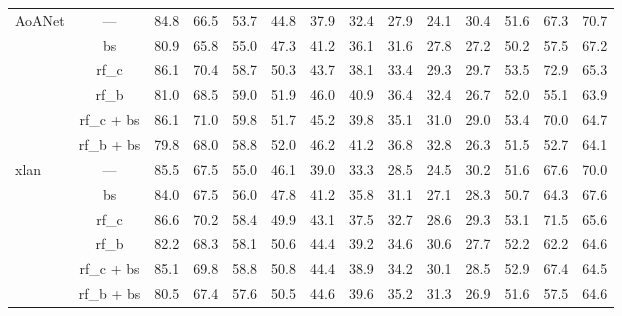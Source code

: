 \documentclass[journal,comsoc]{IEEEtran}
\begin{document}
\begin{table*}[htp]
\begin{tabular}{l|c|cccccccccccc}
\multirow{6}{*}{AoANet \cite{huang2019attention}}                      & ---  & 84.8   &   66.5   &   53.7   &   44.8   &   37.9   &   32.4   &   27.9   &   24.1   &   30.4   &   51.6   &   67.3   &   70.7    \\
                                          & bs    &  80.9   &   65.8   &   55.0   &   47.3   &   41.2   &   36.1   &   31.6   &   27.8   &   27.2   &   50.2   &   57.5   &   67.2    \\
                                          & rf\_c  &  86.1   &   70.4   &   58.7   &   50.3   &   43.7   &   38.1   &   33.4   &   29.3   &   29.7   &   53.5   &   72.9   &   65.3    \\
                                          & rf\_b   &  81.0   &   68.5   &   59.0   &   51.9   &   46.0   &   40.9   &   36.4   &   32.4   &   26.7   &   52.0   &   55.1   &   63.9    \\
                                          & rf\_c + bs   &   86.1   &   71.0   &   59.8   &   51.7   &   45.2   &   39.8   &   35.1   &   31.0   &   29.0   &   53.4   &   70.0   &   64.7    \\
                                          & rf\_b + bs  &  79.8   &   68.0   &   58.8   &   52.0   &   46.2   &   41.2   &   36.8   &   32.8   &   26.3   &   51.5   &   52.7   &   64.1    \\ \hline
\multirow{6}{*}{xlan \cite{pan2020x}}     & ---   & 85.5   &   67.5   &   55.0   &   46.1   &   39.0   &   33.3   &   28.5   &   24.5   &   30.2   &   51.6   &   67.6   &   70.0    \\
                                          & bs    & 84.0   &   67.5   &   56.0   &   47.8   &   41.2   &   35.8   &   31.1   &   27.1   &   28.3   &   50.7   &   64.3   &   67.6    \\
                                          & rf\_c   & 86.6   &   70.2   &   58.4   &   49.9   &   43.1   &   37.5   &   32.7   &   28.6   &   29.3   &   53.1   &   71.5   &   65.6    \\
                                          & rf\_b   & 82.2   &   68.3   &   58.1   &   50.6   &   44.4   &   39.2   &   34.6   &   30.6   &   27.7   &   52.2   &   62.2   &   64.6    \\
                                          & rf\_c + bs  &  85.1   &   69.8   &   58.8   &   50.8   &   44.4   &   38.9   &   34.2   &   30.1   &   28.5   &   52.9   &   67.4   &   64.5    \\
                                          & rf\_b + bs  &  80.5   &   67.4   &   57.6   &   50.5   &   44.6   &   39.6   &   35.2   &   31.3   &   26.9   &   51.6   &   57.5   &   64.6    \\ \hline

\end{tabular}
\end{table*}
\end{document}
